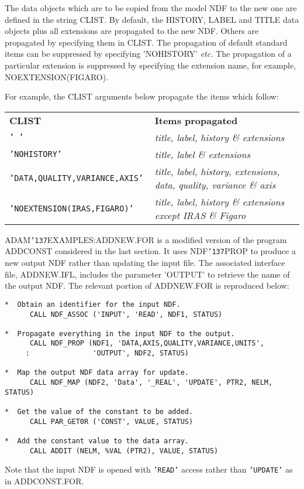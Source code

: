 \documentclass[twoside,11pt]{article}
\renewcommand{\_}{{\tt\char'137}}
\begin{document}
The data objects which are to be copied from the model NDF to the
new one are defined in the string CLIST.
By default, the HISTORY, LABEL and TITLE
data objects plus all extensions
are propagated to the new NDF.
Others are propagated by specifying them in CLIST.
The propagation of default standard items can be suppressed by
specifying 'NOHISTORY' {\it etc.}
The propagation of a particular extension is suppressed by specifying the
extension name, for example, NOEXTENSION(FIGARO).

For example, the CLIST arguments below propagate the items which follow:

\begin{tabular}{ll}
{\bf{CLIST}                             }&\bf{Items propagated}\\
{\tt ' '                                }&{\sl title, label, history \& extensions}\\
{\tt 'NOHISTORY'                        }&{\sl title, label \& extensions}\\
{\tt 'DATA,QUALITY,VARIANCE,AXIS'       }&{\sl title, label, history, extensions, data, quality, variance \& axis}\\
{\tt 'NOEXTENSION(IRAS,FIGARO)'         }&{\sl title, label, history \& extensions except IRAS \& Figaro}\\
\end{tabular}

ADAM\_EXAMPLES:ADDNEW.FOR is
a modified version of the program ADDCONST considered in the last section.
It uses NDF\_PROP to produce a new output NDF rather than updating the input
file.
The associated interface file, ADDNEW.IFL, includes the
parameter 'OUTPUT' to retrieve the name of  the output NDF.
The relevant portion of ADDNEW.FOR is reproduced below:
\begin{verbatim}
*  Obtain an identifier for the input NDF.
      CALL NDF_ASSOC ('INPUT', 'READ', NDF1, STATUS)

*  Propagate everything in the input NDF to the output.
      CALL NDF_PROP (NDF1, 'DATA,AXIS,QUALITY,VARIANCE,UNITS',
     :               'OUTPUT', NDF2, STATUS)

*  Map the output NDF data array for update.
      CALL NDF_MAP (NDF2, 'Data', '_REAL', 'UPDATE', PTR2, NELM, STATUS)

*  Get the value of the constant to be added.
      CALL PAR_GET0R ('CONST', VALUE, STATUS)

*  Add the constant value to the data array.
      CALL ADDIT (NELM, %VAL (PTR2), VALUE, STATUS)
\end{verbatim}
Note that the input NDF is opened with {\tt 'READ'} access rather than
{\tt 'UPDATE'} as in ADDCONST.FOR.
\end{document}
